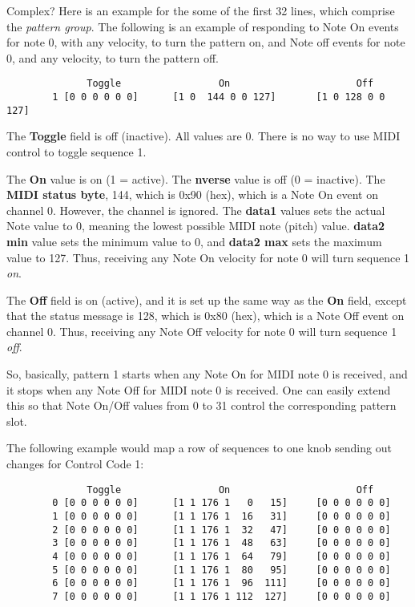    Complex?  Here is an example for the some of the first 32 lines, which
   comprise the \textsl{pattern group}.
   The following is an example of responding
   to Note On events for note 0, with any velocity, to turn the pattern on,
   and Note off events for note 0, and any velocity, to turn the pattern
   off.

   \begin{verbatim}
	          Toggle                 On                      Off
        1 [0 0 0 0 0 0]      [1 0  144 0 0 127]       [1 0 128 0 0 127]
   \end{verbatim}

   The \textbf{Toggle} field is off (inactive).  All values are 0.
   There is no way to use MIDI control to toggle sequence 1.

   The \textbf{On} value is on (1 = active).
   The \textbf{nverse} value is off (0 = inactive).
   The \textbf{MIDI status byte}, 144, which is 0x90 (hex), which is a Note On
   event on channel 0.  However, the channel is ignored.
   The \textbf{data1} values sets the actual Note value to 0, meaning the
   lowest possible MIDI note (pitch) value.
   \textbf{data2 min} value sets
   the minimum value to 0, and
   \textbf{data2 max} sets the maximum value to 127.
   Thus, receiving any Note On velocity for note 0 will turn sequence 1
   \textsl{on}.

   The \textbf{Off} field is on (active), and it is set up the same way as the
   \textbf{On} field, except that the status message is
   128, which is 0x80 (hex), which is a Note Off event on channel 0.
   Thus, receiving any Note Off velocity for note 0 will turn sequence 1
   \textsl{off}.

   So, basically, pattern 1 starts when any Note On for MIDI note 0
   is received, and it stops when any Note Off for MIDI note 0 is received.  
   One can easily extend this so that Note On/Off values from 0 to 31
   control the corresponding pattern slot.

   The following example would map a row of sequences to one knob sending
   out changes for Control Code 1:

   \begin{verbatim}
	          Toggle                 On                      Off
        0 [0 0 0 0 0 0]      [1 1 176 1   0   15]     [0 0 0 0 0 0]
        1 [0 0 0 0 0 0]      [1 1 176 1  16   31]     [0 0 0 0 0 0]
        2 [0 0 0 0 0 0]      [1 1 176 1  32   47]     [0 0 0 0 0 0]
        3 [0 0 0 0 0 0]      [1 1 176 1  48   63]     [0 0 0 0 0 0]
        4 [0 0 0 0 0 0]      [1 1 176 1  64   79]     [0 0 0 0 0 0]
        5 [0 0 0 0 0 0]      [1 1 176 1  80   95]     [0 0 0 0 0 0]
        6 [0 0 0 0 0 0]      [1 1 176 1  96  111]     [0 0 0 0 0 0]
        7 [0 0 0 0 0 0]      [1 1 176 1 112  127]     [0 0 0 0 0 0]
   \end{verbatim}

